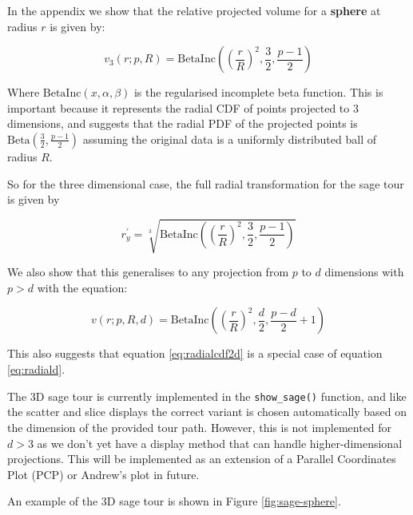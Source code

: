 In the appendix we show that the relative projected volume for a \textbf{sphere} at radius \(r\) is given by:

\begin{equation}
  v_3(r; p, R) = \mathrm{BetaInc}\left(\left(\frac{r}{R}\right)^2, \frac{3}{2}, \frac{p-1}{2}\right) 
\end{equation}

Where \(\mathrm{BetaInc}(x, \alpha, \beta)\) is the regularised incomplete beta function. This is important because it represents the radial CDF of points projected to 3 dimensions, and suggests that the radial PDF of the projected points is \(\mathrm{Beta}\left(\frac{3}{2}, \frac{p-1}{2}\right)\) assuming the original data is a uniformly distributed ball of radius \(R\).

So for the three dimensional case, the full radial transformation for the sage tour is given by

\begin{equation}
r_y^\prime = \sqrt[3]{\mathrm{BetaInc}\left(\left(\frac{r}{R}\right)^2, \frac{3}{2}, \frac{p-1}{2}\right)}
\label{eq:radial3}
\end{equation}

We also show that this generalises to any projection from \(p\) to \(d\) dimensions with \(p>d\) with the equation:

\begin{equation}
v(r; p, R, d) = \mathrm{BetaInc}\left(\left(\frac{r}{R}\right)^2, \frac{d}{2}, \frac{p-d}{2}+1\right)
\label{eq:radiald}
\end{equation}

This also suggests that equation \eqref{eq:radialcdf2d} is a special case of equation \eqref{eq:radiald}.

The 3D sage tour is currently implemented in the \texttt{show\_sage()} function, and like the scatter and slice displays the correct variant is chosen automatically based on the dimension of the provided tour path. However, this is not implemented for \(d>3\) as we don't yet have a display method that can handle higher-dimensional projections. This will be implemented as an extension of a Parallel Coordinates Plot (PCP) or Andrew's plot in future.

An example of the 3D sage tour is shown in Figure \ref{fig:sage-sphere}.

